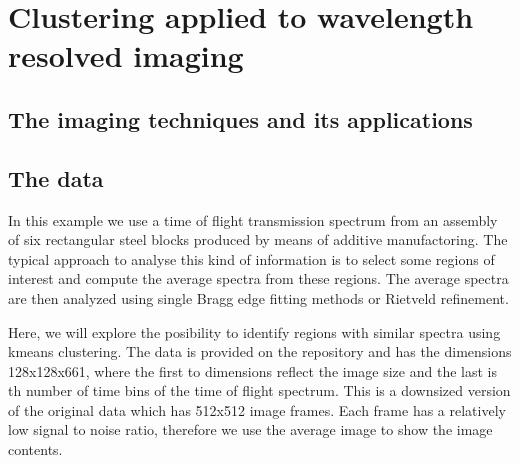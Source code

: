 \documentclass[letterpaper,10pt,english]{sphinxmanual}
\begin{document}
\section{Clustering applied to wavelength resolved imaging}
\label{\detokenize{ML4NeutronImageSegmentation:clustering-applied-to-wavelength-resolved-imaging}}

\subsection{The imaging techniques and its applications}
\label{\detokenize{ML4NeutronImageSegmentation:the-imaging-techniques-and-its-applications}}

\subsection{The data}
\label{\detokenize{ML4NeutronImageSegmentation:the-data}}
In this example we use a time of flight transmission spectrum from an assembly of six rectangular steel blocks produced by means of additive manufactoring. The typical approach to analyse this kind of information is to select some regions of interest and compute the average spectra from these regions. The average spectra are then analyzed using single Bragg edge fitting methods or Rietveld refinement.

Here, we will explore the posibility to identify regions with similar spectra using k\sphinxhyphen{}means clustering. The data is provided on the repository and has the dimensions 128x128x661, where the first to dimensions reflect the image size and the last is th number of time bins of the time of flight spectrum. This is a downsized version of the original data which has 512x512 image frames. Each frame has a relatively low signal to noise ratio, therefore we use the average image  to show the image contents.

\begin{sphinxVerbatim}[commandchars=\\\{\}]
   
  
\end{sphinxVerbatim}

\noindent{}
\end{document}

